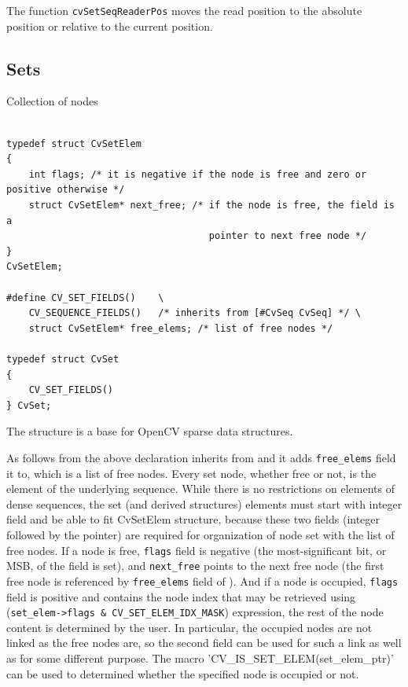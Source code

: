 The function \texttt{cvSetSeqReaderPos} moves the read position to the absolute position or relative to the current position.

\subsection{Sets}

\label{CvSet}

Collection of nodes

\begin{lstlisting}

typedef struct CvSetElem
{
    int flags; /* it is negative if the node is free and zero or positive otherwise */
    struct CvSetElem* next_free; /* if the node is free, the field is a
                                    pointer to next free node */
}
CvSetElem;

#define CV_SET_FIELDS()    \
    CV_SEQUENCE_FIELDS()   /* inherits from [#CvSeq CvSeq] */ \
    struct CvSetElem* free_elems; /* list of free nodes */

typedef struct CvSet
{
    CV_SET_FIELDS()
} CvSet;

\end{lstlisting}

The structure  is a base for OpenCV sparse data structures.

As follows from the above declaration \cross{CvSet} inherits from
 and it adds \texttt{free\_elems} field it to, which
is a list of free nodes. Every set node, whether free or not, is the
element of the underlying sequence. While there is no restrictions on
elements of dense sequences, the set (and derived structures) elements
must start with integer field and be able to fit CvSetElem structure,
because these two fields (integer followed by the pointer) are required
for organization of node set with the list of free nodes. If a node is
free, \texttt{flags} field is negative (the most-significant bit, or
MSB, of the field is set), and \texttt{next\_free} points to the next
free node (the first free node is referenced by \texttt{free\_elems}
field of \cross{CvSet}). And if a node is occupied, \texttt{flags} field
is positive and contains the node index that may be retrieved using
(\texttt{set\_elem->flags \& CV\_SET\_ELEM\_IDX\_MASK}) expression, the rest of
the node content is determined by the user. In particular, the occupied
nodes are not linked as the free nodes are, so the second field can be
used for such a link as well as for some different purpose. The macro
'CV\_IS\_SET\_ELEM(set\_elem\_ptr)' can be used to determined whether
the specified node is occupied or not.

